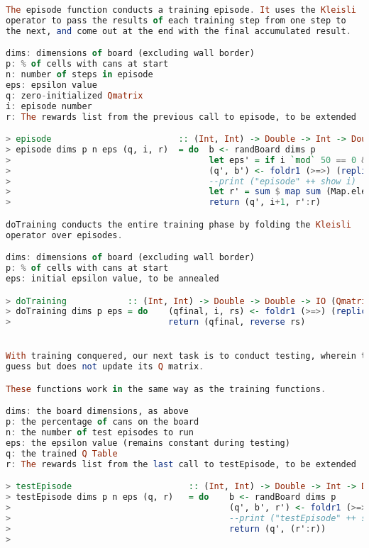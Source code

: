 \documentclass[12pt,a4paper]{article}
\begin{document}
\begin{lstlisting}[language=Haskell,numbers=none,basicstyle=\tiny]
The episode function conducts a training episode. It uses the Kleisli
operator to pass the results of each training step from one step to 
the next, and come out at the end with the final accumulated result.

dims: dimensions of board (excluding wall border)
p: % of cells with cans at start
n: number of steps in episode
eps: epsilon value
q: zero-initialized Qmatrix
i: episode number
r: The rewards list from the previous call to episode, to be extended

> episode                         :: (Int, Int) -> Double -> Int -> Double -> (Qmatrix, Int, [Double]) -> IO (Qmatrix, Int, [Double])
> episode dims p n eps (q, i, r)  = do  b <- randBoard dims p
>                                       let eps' = if i `mod` 50 == 0 && eps > 0.1 then eps - 0.01 else eps
>                                       (q', b') <- foldr1 (>=>) (replicate n (train eps')) (q,b)
>                                       --print ("episode" ++ show i)
>                                       let r' = sum $ map sum (Map.elems q')
>                                       return (q', i+1, r':r)

doTraining conducts the entire training phase by folding the Kleisli 
operator over episodes.

dims: dimensions of board (excluding wall border)
p: % of cells with cans at start
eps: initial epsilon value, to be annealed

> doTraining            :: (Int, Int) -> Double -> Double -> IO (Qmatrix, [Double])
> doTraining dims p eps = do    (qfinal, i, rs) <- foldr1 (>=>) (replicate n_episodes (episode dims p n_steps eps)) (newQTable,1, [0])
>                               return (qfinal, reverse rs)


With training conquered, our next task is to conduct testing, wherein the robot makes a 
guess but does not update its Q matrix.

These functions work in the same way as the training functions.

dims: the board dimensions, as above 
p: the percentage of cans on the board 
n: the number of test episodes to run 
eps: the epsilon value (remains constant during testing)
q: the trained Q Table 
r: The rewards list from the last call to testEpisode, to be extended

> testEpisode                       :: (Int, Int) -> Double -> Int -> Double -> (Qmatrix, [Double]) -> IO (Qmatrix, [Double])
> testEpisode dims p n eps (q, r)   = do    b <- randBoard dims p
>                                           (q', b', r') <- foldr1 (>=>) (replicate n (test eps)) (q,b,0.0)
>                                           --print ("testEpisode" ++ show i)
>                                           return (q', (r':r))
>                                           


\end{lstlisting}
\end{document}
